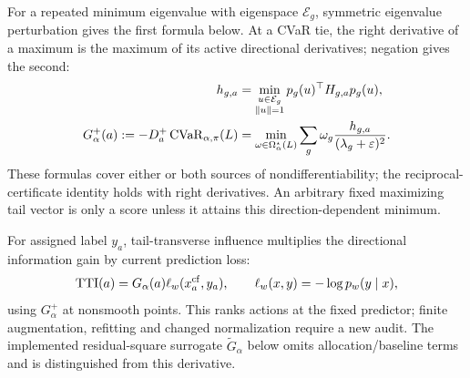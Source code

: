 For a repeated minimum eigenvalue with eigenspace $\mathcal E_g$, symmetric eigenvalue perturbation gives the first formula below. At a CVaR tie, the right derivative of a maximum is the maximum of its active directional derivatives; negation gives the second:
\begin{equation}
\begin{aligned}
h_{g,a}&=\min_{\substack{u\in\mathcal E_g\\\lVert u\rVert=1}}
p_g(u)^\top H_{g,a}p_g(u),\\
G_\alpha^+(a):=-D_a^+\operatorname{CVaR}_{\alpha,\pi}(L)
&=\min_{\omega\in\Omega_\alpha^\star(L)}
\sum_g\omega_g\frac{h_{g,a}}{(\lambda_g+\varepsilon)^2}.
\end{aligned}
\label{eq:influence-tied-cvar-gain}
\end{equation}
These formulas cover either or both sources of nondifferentiability; the reciprocal-certificate identity holds with right derivatives. An arbitrary fixed maximizing tail vector is only a score unless it attains this direction-dependent minimum.

For assigned label $y_a$, tail-transverse influence multiplies the directional information gain by current prediction loss:
\begin{equation}
\mathrm{TTI}(a)=G_\alpha(a)\ell_w(x_a^{\mathrm{cf}},y_a),
\qquad \ell_w(x,y)=-\log p_w(y\mid x),
\label{eq:tail-transverse-influence}
\end{equation}
using $G_\alpha^+$ at nonsmooth points. This ranks actions at the fixed predictor; finite augmentation, refitting and changed normalization require a new audit. The implemented residual-square surrogate $\widetilde G_\alpha$ below omits allocation/baseline terms and is distinguished from this derivative.
